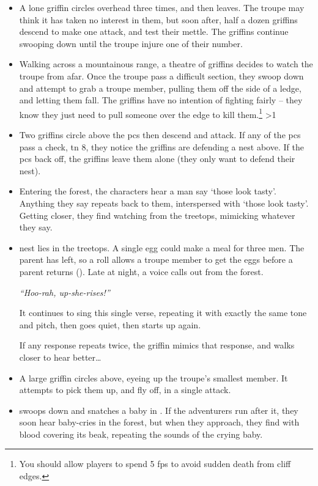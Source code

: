 \begin{multicols}{2}
\begin{itemize}
  \item
  A lone \gls{griffin} circles overhead three times, and then leaves.
  The troupe may think it has taken no interest in them, but soon after, half a dozen \glspl{griffin} descend to make one attack, and test their mettle.
  The \glspl{griffin} continue swooping down until the troupe injure one of their number.
  \item
  Walking across a mountainous range, a theatre of \glspl{griffin} decides to watch the troupe from afar.
  Once the troupe pass a difficult section, they swoop down and attempt to grab a troupe member, pulling them off the side of a ledge, and letting them fall.
  The \glspl{griffin} have no intention of fighting fairly -- they know they just need to pull someone over the edge to kill them.\footnote{You should allow players to spend 5 \glspl{fp} to avoid sudden death from cliff edges.}
  \ifnum\value{temperature}>1
    \item
    Two \glspl{griffin} circle above the \glspl{pc} then descend and attack.
    If any of the \glspl{pc} pass a  check, \gls{tn} 8, they notice the \glspl{griffin} are defending a nest above.
    If the \glspl{pc} back off, the \glspl{griffin} leave them alone (they only want to defend their nest).
  \else
    \item
    Entering the forest, the characters hear a man say `those look tasty'.
    Anything they say repeats back to them, interspersed with `those look tasty'.
    Getting closer, they find  watching from the treetops, mimicking whatever they say.
  \fi
  \item
  \ifodd\value{r4}
     nest lies in the treetops.
    A single egg could make a meal for three men.
    The parent has left, so a  roll allows a troupe member to get the eggs before a parent returns (\tn[9]).
  \else
    Late at night, a voice calls out from the forest.

    \textit{``Hoo-rah, up-she-rises!''}

    It continues to sing this single verse, repeating it with exactly the same tone and pitch, then goes quiet, then starts up again.

    If any response repeats twice, the \gls{griffin} mimics that response, and walks closer to hear better\ldots
  \fi
  \item
  A large \gls{griffin} circles above, eyeing up the troupe's smallest member.
  It attempts to pick them up, and fly off, in a single attack.
  \item
   swoops down and snatches a baby in .
  If the adventurers run after it, they soon hear baby-cries in the forest, but when they approach, they find  with blood covering its beak, repeating the sounds of the crying baby.


\end{itemize}
\end{multicols}
